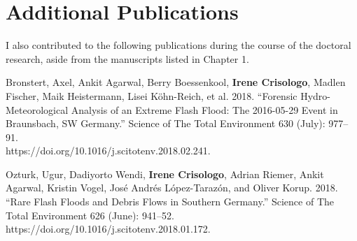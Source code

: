 
\chapter{Additional Publications} %

\label{Chapter7} %





I also contributed to the following publications during the course of the doctoral research, aside from the manuscripts listed in Chapter 1. 

\bigskip
\bigskip

\noindent
Bronstert, Axel, Ankit Agarwal, Berry Boessenkool, \textbf{Irene Crisologo}, Madlen Fischer, Maik Heistermann, Lisei Köhn-Reich, et al. 2018. “Forensic Hydro-Meteorological Analysis of an Extreme Flash Flood: The 2016-05-29 Event in Braunsbach, SW Germany.” Science of The Total Environment 630 (July): 977–91.\\https://doi.org/10.1016/j.scitotenv.2018.02.241.

\bigskip

\noindent
Ozturk, Ugur, Dadiyorto Wendi, \textbf{Irene Crisologo}, Adrian Riemer, Ankit Agarwal, Kristin Vogel, José Andrés López-Tarazón, and Oliver Korup. 2018. “Rare Flash Floods and Debris Flows in Southern Germany.” Science of The Total Environment 626 (June): 941–52. https://doi.org/10.1016/j.scitotenv.2018.01.172.
